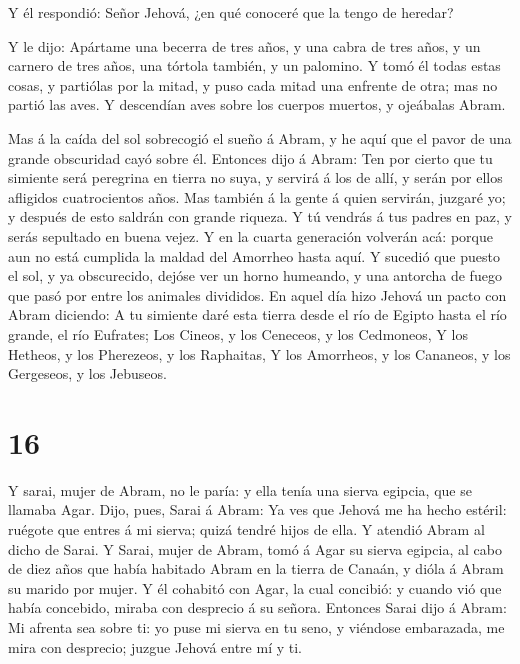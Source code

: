  Y él respondió: Señor Jehová, ¿en qué conoceré que la tengo
de heredar?

 Y le dijo: Apártame una becerra de tres años, y una cabra
de tres años, y un carnero de tres años, una tórtola también, y un
palomino.  Y tomó él todas estas cosas, y partiólas por la
mitad, y puso cada mitad una enfrente de otra; mas no partió las aves.
 Y descendían aves sobre los cuerpos muertos, y ojeábalas
Abram.

 Mas á la caída del sol sobrecogió el sueño á Abram, y he
aquí que el pavor de una grande obscuridad cayó sobre él. 
Entonces dijo á Abram: Ten por cierto que tu simiente será peregrina en
tierra no suya, y servirá á los de allí, y serán por ellos afligidos
cuatrocientos años.  Mas también á la gente á quien
servirán, juzgaré yo; y después de esto saldrán con grande riqueza.
 Y tú vendrás á tus padres en paz, y serás sepultado en
buena vejez.  Y en la cuarta generación volverán acá:
porque aun no está cumplida la maldad del Amorrheo hasta aquí.
 Y sucedió que puesto el sol, y ya obscurecido, dejóse ver
un horno humeando, y una antorcha de fuego que pasó por entre los
animales divididos.  En aquel día hizo Jehová un pacto con
Abram diciendo: A tu simiente daré esta tierra desde el río de Egipto
hasta el río grande, el río Eufrates;  Los Cineos, y los
Ceneceos, y los Cedmoneos,  Y los Hetheos, y los Pherezeos,
y los Raphaitas,  Y los Amorrheos, y los Cananeos, y los
Gergeseos, y los Jebuseos.

\hypertarget{section-15}{%
\section{16}\label{section-15}}

 Y sarai, mujer de Abram, no le paría: y ella tenía una
sierva egipcia, que se llamaba Agar.  Dijo, pues, Sarai á
Abram: Ya ves que Jehová me ha hecho estéril: ruégote que entres á mi
sierva; quizá tendré hijos de ella. Y atendió Abram al dicho de Sarai.
 Y Sarai, mujer de Abram, tomó á Agar su sierva egipcia, al
cabo de diez años que había habitado Abram en la tierra de Canaán, y
dióla á Abram su marido por mujer.  Y él cohabitó con Agar,
la cual concibió: y cuando vió que había concebido, miraba con desprecio
á su señora.  Entonces Sarai dijo á Abram: Mi afrenta sea
sobre ti: yo puse mi sierva en tu seno, y viéndose embarazada, me mira
con desprecio; juzgue Jehová entre mí y ti.

